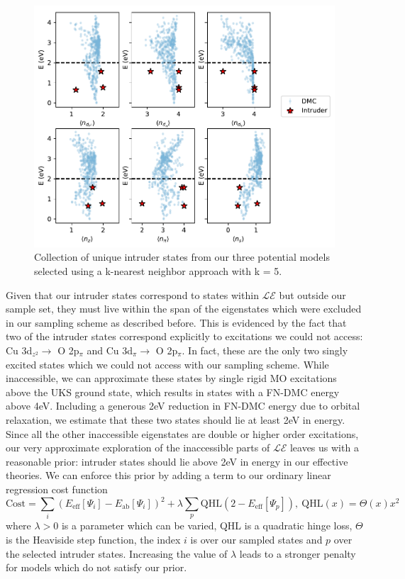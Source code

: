 \documentclass{article}
\begin{document}
\begin{figure}[H]
\centering
\includegraphics[width=0.7\linewidth]{../qwalk/old/ub3lyp_s1_/analysis/figs/intruder.pdf}
\caption{Collection of unique intruder states from our three potential models selected using a k-nearest neighbor approach with k = 5.}
\label{fig:Intruder}
\end{figure}

Given that our intruder states correspond to states within $\mathcal{LE}$ but outside our sample set, they must live within the span of the eigenstates which were excluded in our sampling scheme as described before.
This is evidenced by the fact that two of the intruder states correspond explicitly to excitations we could not access: Cu 3d$_{z^2} \rightarrow $ O 2p$_\pi$ and  Cu 3d$_\pi \rightarrow $ O 2p$_\pi$.
In fact, these are the only two singly excited states which we could not access with our sampling scheme.
While inaccessible, we can approximate these states by single rigid MO excitations above the UKS ground state, which results in states with a FN-DMC energy above 4eV.
Including a generous 2eV reduction in FN-DMC energy due to orbital relaxation, we estimate that these two states should lie at least 2eV in energy. 
Since all the other inaccessible eigenstates are double or higher order excitations, our very approximate exploration of the inaccessible parts of $\mathcal{LE}$ leaves us with a reasonable prior: intruder states should lie above 2eV in energy in our effective theories.
We can enforce this prior by adding a term to our ordinary linear regression cost function
\begin{equation}
\text{Cost} = \sum_{i} (E_\text{eff}[\Psi_i] - E_\text{ab}[\Psi_i])^2 + \lambda \sum_{p}\text{QHL}(2 - E_\text{eff}[\Psi_p]),\ \text{QHL}(x) = \Theta(x)x^2
\label{eq:cost}
\end{equation}
where $\lambda>0$ is a parameter which can be varied, QHL is a quadratic hinge loss, $\Theta$ is the Heaviside step function, the index $i$ is over our sampled states and $p$ over the selected intruder states.
Increasing the value of $\lambda$ leads to a stronger penalty for models which do not satisfy our prior.
\end{document}
